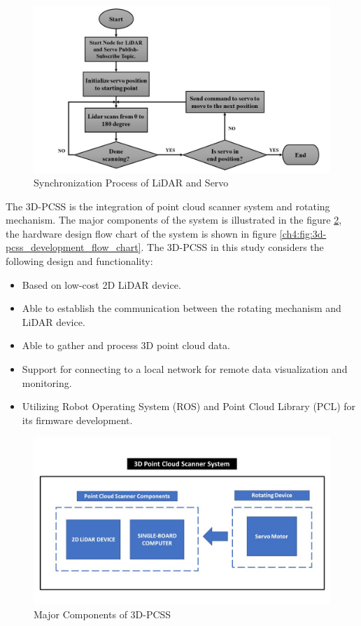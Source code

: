 \begin{figure}[H]
	\centering
	\includegraphics[width=1\textwidth]{Figures/servo_lidar_comm}
	\caption{Synchronization Process of LiDAR and Servo}
	\label{ch4:fig:servo_lidar_comm}
\end{figure}

The 3D-PCSS is the integration of point cloud scanner system and rotating mechanism. The major components of the system is illustrated in the figure \ref{ch4:fig:components_of_3d-pcss}, the hardware design flow chart of the system is shown in figure \ref{ch4:fig:3d-pcss_development_flow_chart}. The 3D-PCSS in this study considers the following design and functionality:
\begin{itemize}
	\item Based on low-cost 2D LiDAR device.
	\item Able to establish the communication between the rotating mechanism and LiDAR device.
	\item Able to gather and process 3D point cloud data.
	\item Support for connecting to a local network for remote data visualization and monitoring.
	\item Utilizing Robot Operating System (ROS) and Point Cloud Library (PCL) for its firmware development.
\end{itemize}

\begin{figure}[H]
	\centering
	\includegraphics[width=1\textwidth]{Figures/3D-PCSS components}
	\caption{Major Components of 3D-PCSS}
	\label{ch4:fig:components_of_3d-pcss}
\end{figure}

